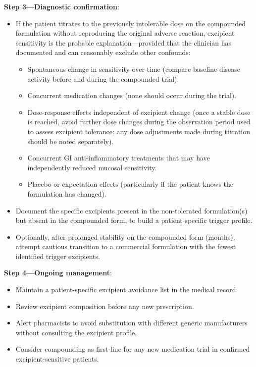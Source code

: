 \begin{directive}
\textbf{Step 3---Diagnostic confirmation}:
\begin{itemize}
    \item If the patient titrates to the previously intolerable dose on the compounded formulation without reproducing the original adverse reaction, excipient sensitivity is the probable explanation---provided that the clinician has documented and can reasonably exclude other confounds:
    \begin{itemize}
        \item Spontaneous change in sensitivity over time (compare baseline disease activity before and during the compounded trial).
        \item Concurrent medication changes (none should occur during the trial).
        \item Dose-response effects independent of excipient change (once a stable dose is reached, avoid further dose changes during the observation period used to assess excipient tolerance; any dose adjustments made during titration should be noted separately).
        \item Concurrent GI anti-inflammatory treatments that may have independently reduced mucosal sensitivity.
        \item Placebo or expectation effects (particularly if the patient knows the formulation has changed).
    \end{itemize}
    \item Document the specific excipients present in the non-tolerated formulation(s) but absent in the compounded form, to build a patient-specific trigger profile.
    \item Optionally, after prolonged stability on the compounded form (months), attempt cautious transition to a commercial formulation with the fewest identified trigger excipients.
\end{itemize}

\textbf{Step 4---Ongoing management}:
\begin{itemize}
    \item Maintain a patient-specific excipient avoidance list in the medical record.
    \item Review excipient composition before any new prescription.
    \item Alert pharmacists to avoid substitution with different generic manufacturers without consulting the excipient profile.
    \item Consider compounding as first-line for any new medication trial in confirmed excipient-sensitive patients.
\end{itemize}
\end{directive}

